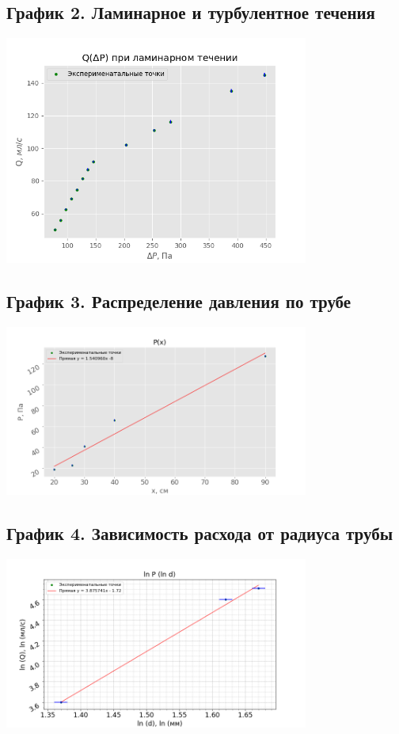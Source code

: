 \documentclass[15pt,a5paper,reqno]{article}
\begin{document}
    \subsection{График 2. Ламинарное и турбулентное течения}
    \begin{center}
        \includegraphics[width = 0.75\textwidth]{График 2.png}
    \end{center}
    
    \subsection{График 3. Распределение давления по трубе}
    \begin{center}
        \includegraphics[width = 0.75\textwidth]{График 3.png}
    \end{center}
    
    \subsection{График 4. Зависимость расхода от радиуса трубы}
    \begin{center}
        \includegraphics[width = 0.75\textwidth]{График 4.png}
    \end{center}
\end{document}
